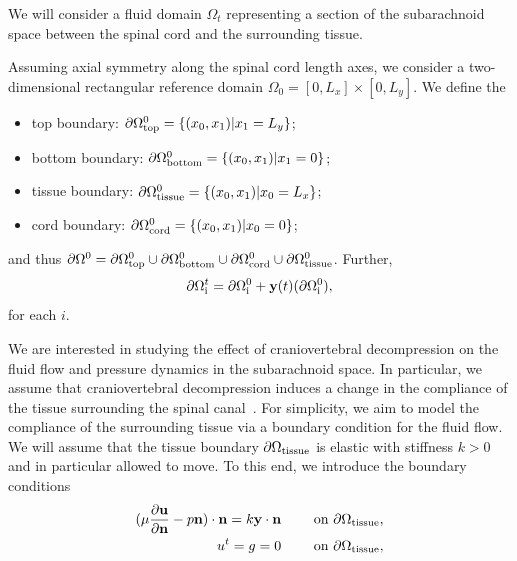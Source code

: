\documentclass[11pt,a4paper,titlepage]{report}
\begin{document}
We will consider a fluid domain $\Omega_t$ representing a section of
the subarachnoid space between the spinal cord and the surrounding
tissue.

Assuming axial symmetry along the spinal cord length axes, we consider
a two-dimensional rectangular reference domain $\Omega_0 = [0, L_x]
\times [0, L_y]$. We define the
\begin{itemize}
\item
  top boundary: $\partial \Omega_{\rm top}^0 = \{ (x_0, x_1) | x_1 = L_y\}$;
\item
  bottom boundary: $\partial \Omega_{\rm bottom}^0 = \{ (x_0, x_1) | x_1 = 0\}$;
\item
  tissue boundary: $\partial \Omega_{\rm tissue}^0 = \{ (x_0, x_1) | x_0 = L_x\}$;
\item
  cord boundary: $\partial \Omega_{\rm cord}^0 = \{ (x_0, x_1) | x_0 = 0\}$;
\end{itemize}
and thus $\partial \Omega^0 = \partial \Omega_{\rm top}^0 \cup
\partial \Omega_{\rm bottom}^0 \cup \partial \Omega_{\rm cord}^0 \cup
\partial \Omega_{\rm tissue}^0$. Further,
\begin{equation}
  \partial \Omega^t_{\rm i} = \partial \Omega^0_{\rm i} + \mathbf{y}(t)(\partial \Omega^0_{\rm i}),
\end{equation}
for each $i$.

We are interested in studying the effect of craniovertebral
decompression on the fluid flow and pressure dynamics in the
subarachnoid space. In particular, we assume that craniovertebral
decompression induces a change in the compliance of the tissue
surrounding the spinal canal~\cite{}. For simplicity, we aim to model
the compliance of the surrounding tissue via a boundary condition for
the fluid flow. We will assume that the tissue boundary $\partial
\Omega_{\rm tissue}$ is elastic with stiffness $k > 0$ and in particular
allowed to move. To this end, we introduce the boundary conditions
\begin{align}
\label{eq:bc:1}
(\mu \frac{\partial \mathbf{u}}{\partial \mathbf{n}} - p \mathbf{n}) \cdot \mathbf{n} = k \mathbf{y} \cdot \mathbf{n} \qquad \text{ on } \partial \Omega_{\rm tissue},\\
\label{eq:bc:3}
u^t = g = 0 \qquad \text{ on } \partial \Omega_{\rm tissue},
\end{align}

\end{document}
